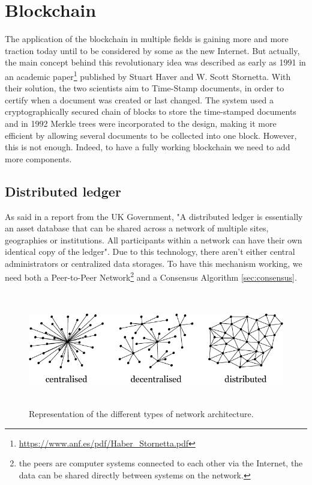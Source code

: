 \chapter{Blockchain}
\label{cha:blockchain}

The application of the blockchain in multiple fields is gaining more and more 
traction today until to be considered by some as the new Internet.
But actually, the main concept behind this revolutionary idea was described as 
early as 1991 in an academic paper\footnote{\url{https://www.anf.es/pdf/Haber_Stornetta.pdf}}
published by Stuart Haver and W. Scott Stornetta. With their solution, the two 
scientists aim to Time-Stamp documents, in order to certify when a document
was created or last changed. The system used a cryptographically secured 
chain of blocks to store the time-stamped documents and in 1992 Merkle 
trees were incorporated to the design, making it more efficient by 
allowing several documents to be collected into one block.\cite{binancevision}
However, this is not enough. Indeed, to have a fully working blockchain 
we need to add more components.




\section{Distributed ledger}
\label{sec:ledger}

As said in a report from the UK Government, "A distributed ledger is 
essentially an asset database that can be shared across a network of 
multiple sites, geographies or institutions. All participants within a 
network can have their own identical copy of the ledger"\cite{ukgov}.
Due to this technology, there aren't either central administrators or 
centralized data storages. To have this mechanism working, we need both
a Peer-to-Peer Network\footnote{the peers are computer systems connected
to each other via the Internet, the data can be shared directly between 
systems on the network.} and a Consensus Algorithm \ref{sec:consensus}. 

\begin{figure}[h]
    \centering
    \includegraphics[height=5cm, width=\textwidth]{distributed.png}
    \caption{Representation of the different types of network architecture.\cite{fauna}}
    \label{fig:dis}
\end{figure}


